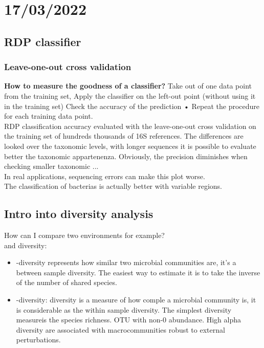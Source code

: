 \graphicspath{{chapters/images/06}}

\chapter{17/03/2022}

\section{RDP classifier}

\subsection{Leave-one-out cross validation}

\textbf{How to measure the goodness of a classifier?}
Take out of one data point from the training set,  Apply the classifier on the left-out point (without using it in the training set) Check the accuracy of the prediction
• Repeat the procedure for each training data point. 
\\
RDP classification accuracy evaluated with the leave-one-out
cross validation on the training set of hundreds thousands of 16S
references. The differences are looked over the taxonomic levels, with longer sequences it is possible to evaluate better the taxonomic appartenenza. Obviously, the precision diminishes when checking smaller taxonomic ... %
\\
In real applications, sequencing errors can make this plot worse. 
\\
The classification of bacterias is actually better with variable regions. 

\section{Intro into diversity analysis}

How can I compare two environments for example?
\\
\alpha and \beta diversity: 

\begin{itemize}
	\item \beta -diversity represents how similar two microbial communities are, it's a between sample diversity. The easiest way to estimate it is to take the inverse of the number of shared species.  
	\item \alpha -diversity:  diversity is a measure of how comple a microbial community is, it is considerable as the within sample diversity. The simplest \alpha diversity measureis the species richness. OTU with non-0 abundance. High alpha diversity are associated with macrocommunities robust to external perturbations. 
\end{itemize}

